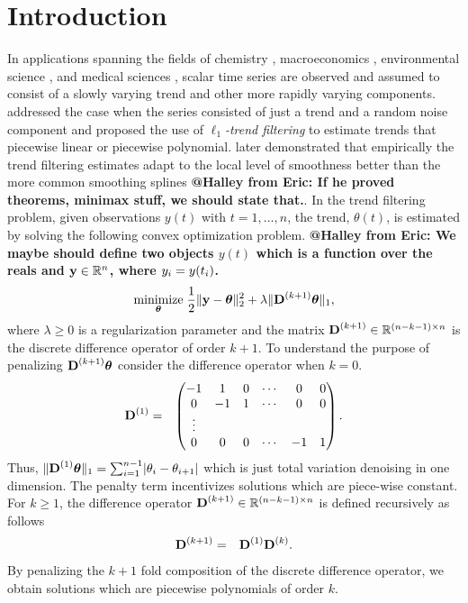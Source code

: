 \documentclass[12pt]{article}
\makeatletter
\newcommand{\Halley}[2]{{\bf {\color{purple}@Halley from #1: #2}}\xspace}
\newcommand{\Real}{\mathbb{R}}
\newcommand{\V}[1]{{\bm{\mathbf{\MakeLowercase{#1}}}}} %
\newcommand{\VE}[2]{\MakeLowercase{#1}_{#2}} %
\newcommand{\M}[1]{{\bm{\mathbf{\MakeUppercase{#1}}}}} %
\newcommand{\Mn}[2]{\M{#1}^{(#2)}} %
\makeatother
\begin{document}
	\newpage
	\section{Introduction}
	\label{sec:intro}
	
	In applications spanning the fields of chemistry \citep{Ning2014}, macroeconomics \citep{yamada2017estimating}, environmental science \citep{brantley2014mobile}, and medical sciences \citep{pettersson2013algorithm, marandi2015qualitative}, scalar time series are observed and assumed to consist of a slowly varying trend and other more rapidly varying components. \cite{Kim2009} addressed the case when the series consisted of just a trend and a random noise component and proposed the use of \textit{$\ell_1$-trend filtering} to estimate trends that piecewise linear or piecewise polynomial. \cite{Tib2014} later demonstrated that empirically the trend filtering estimates adapt to the local level of smoothness better than the more common smoothing splines \Halley{Eric}{If he proved theorems, minimax stuff, we should state that.}. In the trend filtering problem, given observations $y(t)$ with $t=1,\ldots,n$, the trend, $\theta(t)$, is estimated by solving the following convex optimization problem. \Halley{Eric}{We maybe should define two objects $y(t)$ which is a function over the reals and $\V{y} \in \Real^n$, where $\VE{y}{i} = y(t_i)$.}
	\begin{eqnarray*}
	\underset{\V{\theta}}{\text{minimize}}\; \frac{1}{2} \lVert \V{y} - \V{\theta} \rVert_2^2 + \lambda \lVert \Mn{D}{k+1}\V{\theta} \rVert_1,
	\end{eqnarray*}
	where $\lambda \geq 0$ is a regularization parameter and the matrix $\Mn{D}{k+1} \in \Real^{(n - k -1) \times n}$ is the discrete difference operator of order $k+1$. To understand the purpose of penalizing $\Mn{D}{k+1}\V{\theta}$ consider the difference operator when $k = 0$.
	\begin{eqnarray*}
	\Mn{D}{1} & = & \begin{pmatrix}
	-1 & 1 & 0 & \cdots & 0 & 0 \\
	0 & -1 & 1 & \cdots & 0 & 0 \\
	\vdots & & & & & \\
	0 & 0 & 0 & \cdots & -1 & 1 \\
	\end{pmatrix}.
	\end{eqnarray*}
	Thus, $\lVert \Mn{D}{1}\V{\theta} \rVert_1 = \sum_{i=1}^{n-1} \lvert \theta_i - \theta_{i+1} \rvert$ which is just total variation denoising in one dimension. The penalty term incentivizes solutions which are piece-wise constant. For $k \geq 1$, the difference operator $\Mn{D}{k+1} \in \Real^{(n-k-1) \times n}$ is defined recursively as follows
	\begin{eqnarray*}
	\Mn{D}{k+1} & = & \Mn{D}{1}\Mn{D}{k}.
	\end{eqnarray*}
	By penalizing the $k+1$ fold composition of the discrete difference operator, we obtain solutions which are piecewise polynomials of order $k$. 
	
\end{document}
